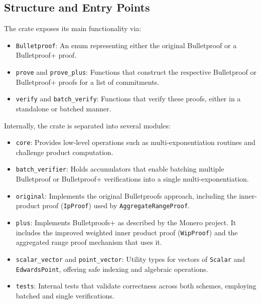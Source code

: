 \documentclass[12pt,a4paper]{article}
\begin{document}
\subsection{Structure and Entry Points}
The crate exposes its main functionality via:
\begin{itemize}
    \item \texttt{Bulletproof}: An enum representing either the original Bulletproof or a Bulletproof+ proof. %
    \item \texttt{prove} and \texttt{prove\_plus}: Functions that construct the respective Bulletproof or Bulletproof+ proofs for a list of commitments. %
    \item \texttt{verify} and \texttt{batch\_verify}: Functions that verify these proofs, either in a standalone or batched manner. %
\end{itemize}

Internally, the crate is separated into several modules:
\begin{itemize}
    \item \texttt{core}: Provides low-level operations such as multi-exponentiation routines and challenge product computation.
    \item \texttt{batch\_verifier}: Holds accumulators that enable batching multiple Bulletproof or Bulletproof+ verifications into a single multi-exponentiation.
    \item \texttt{original}: Implements the original Bulletproofs approach, including the inner-product proof (\texttt{IpProof}) used by \texttt{AggregateRangeProof}.
    \item \texttt{plus}: Implements Bulletproofs+ as described by the Monero project.  It includes the improved weighted inner product proof (\texttt{WipProof}) and the aggregated range proof mechanism that uses it.
    \item \texttt{scalar\_vector} and \texttt{point\_vector}: Utility types for vectors of \texttt{Scalar} and \\\texttt{EdwardsPoint}, offering safe indexing and algebraic operations.
    \item \texttt{tests}: Internal tests that validate correctness across both schemes, employing batched and single verifications.
\end{itemize}
\end{document}

